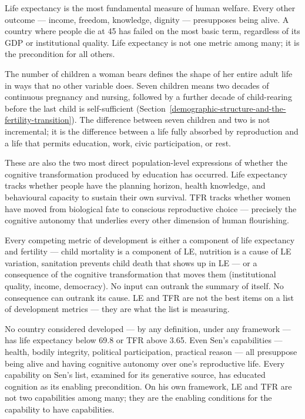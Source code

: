 \documentclass[12pt,letterpaper]{article}
\begin{document}
Life expectancy is the most fundamental measure of human welfare.
Every other outcome --- income, freedom, knowledge, dignity ---
presupposes being alive. A country where people die at 45 has failed
on the most basic term, regardless of its GDP or institutional
quality. Life expectancy is not one metric among many; it is the
precondition for all others.

The number of children a woman bears defines the shape of her entire
adult life in ways that no other variable does. Seven children means
two decades of continuous pregnancy and nursing, followed by a further
decade of child-rearing before the last child is self-sufficient
(Section~\ref{demographic-structure-and-the-fertility-transition}).
The difference between seven children and two is not incremental; it
is the difference between a life fully absorbed by reproduction and a
life that permits education, work, civic participation, or rest.

These are also the two most direct population-level expressions of
whether the cognitive transformation produced by education has
occurred. Life expectancy tracks whether people have the planning
horizon, health knowledge, and behavioural capacity to sustain their
own survival. TFR tracks whether women have moved from biological fate
to conscious reproductive choice --- precisely the cognitive autonomy
that underlies every other dimension of human flourishing.

Every competing metric of development is either a component of life
expectancy and fertility --- child mortality is a component of LE,
nutrition is a cause of LE variation, sanitation prevents child death
that shows up in LE --- or a consequence of the cognitive
transformation that moves them (institutional quality, income,
democracy). No input can outrank the summary of itself. No consequence
can outrank its cause. LE and TFR are not the best items on a list of
development metrics --- they are what the list is measuring.

No country considered developed --- by any definition, under any
framework --- has life expectancy below 69.8 or TFR above 3.65. Even
Sen's capabilities --- health, bodily integrity, political
participation, practical reason --- all presuppose being alive and
having cognitive autonomy over one's reproductive life. Every
capability on Sen's list, examined for its generative source, has
educated cognition as its enabling precondition. On his own
framework, LE and TFR are not two capabilities among many; they are
the enabling conditions for the capability to have capabilities.
\end{document}
